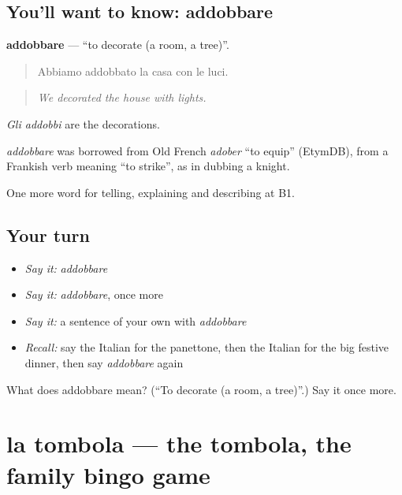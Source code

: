 \subsection*{You'll want to know: addobbare}
\textbf{addobbare} — \textquotedblleft{}to decorate (a room, a tree)\textquotedblright{}.

\begin{quote}
Abbiamo addobbato la casa con le luci.
\end{quote}

\begin{quote}
\emph{We decorated the house with lights.}
\end{quote}

\emph{Gli addobbi} are the decorations.

\begin{cousinweb}
\emph{addobbare} was borrowed from Old French \emph{adober} \textquotedblleft{}to equip\textquotedblright{} (EtymDB), from a Frankish verb meaning \textquotedblleft{}to strike\textquotedblright{}, as in dubbing a knight.
\end{cousinweb}

\begin{grammarlens}[title={What you've built}]
One more word for telling, explaining and describing at B1.
\end{grammarlens}

\subsection*{Your turn}
\begin{itemize}
\raggedright
  \item \emph{Say it:} \emph{addobbare}
  \item \emph{Say it:} \emph{addobbare}, once more
  \item \emph{Say it:} a sentence of your own with \emph{addobbare}
  \item \emph{Recall:} say the Italian for the panettone, then the Italian for the big festive dinner, then say \emph{addobbare} again
\end{itemize}

\begin{tcolorbox}[breakable,colback=teal!4,colframe=teal!35!black,title={Before you move on}]
What does addobbare mean? (\textquotedblleft{}To decorate (a room, a tree)\textquotedblright{}.) Say it once more.
\end{tcolorbox}
\section[la tombola]{la tombola — the tombola, the family bingo game}

